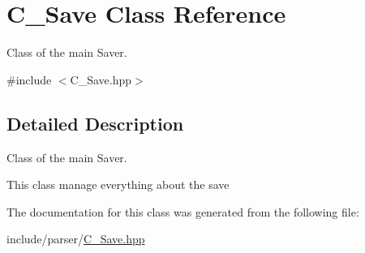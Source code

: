 \hypertarget{classSave}{}\section{C_Save Class Reference}
\label{classSave}


Class of the main Saver.  




{\ttfamily \#include $<$C_Save.\+hpp$>$}



\subsection{Detailed Description}
Class of the main Saver. 

This class manage everything about the save 

The documentation for this class was generated from the following file\+:\begin{DoxyCompactItemize}
\item 
include/parser/\hyperlink{Save_8hpp}{C_Save.\+hpp}\end{DoxyCompactItemize}
